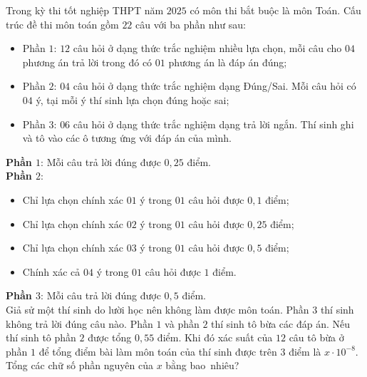 \begin{bt}%
	Trong kỳ thi tốt nghiệp THPT năm $2025$ có môn thi bắt buộc là môn Toán. Cấu trúc đề thi môn toán gồm $22$ câu với ba phần như sau: 
	\begin{itemize}
		\item Phần $1$: $12$ câu  hỏi ở dạng thức trắc nghiệm nhiều lựa chọn, mỗi câu cho $04$ phương án trả lời trong đó có $01$ phương án là đáp án đúng;
		\item Phần $2$: $04$ câu hỏi ở  dạng thức trắc nghiệm dạng Đúng/Sai. Mỗi câu hỏi có $04$ ý, tại mỗi ý thí sinh lựa chọn đúng hoặc sai;
		\item Phần $3$: $06$ câu hỏi ở dạng thức trắc nghiệm dạng trả lời ngắn. Thí sinh ghi và  tô vào các ô tương ứng với đáp án của mình.
	\end{itemize}
	\textbf{Phần $1$}: Mỗi câu  trả lời đúng được $0{,}25$ điểm.\\
	\textbf{Phần $2$}: 
	\begin{itemize}
		\item  Chỉ lựa chọn chính xác $01$ ý trong $01$ câu hỏi được $0{,}1$ điểm;
		\item Chỉ lựa chọn  chính xác $02$ ý trong $01$ câu hỏi được $0{,}25$ điểm;
		\item Chỉ lựa chọn chính xác $03$ ý trong $01$ câu  hỏi được $0{,}5$ điểm;
		\item Chính xác cả $04$ ý trong $01$ câu hỏi  được $1$ điểm.
	\end{itemize}
	\textbf{Phần $3$}: Mỗi câu trả lời đúng được  $0{,}5$ điểm.\\
	Giả sử một thí sinh do lười học nên không làm được môn toán. Phần $3$ thí sinh không trả lời đúng câu nào. Phần $1$ và phần $2$ thí sinh tô bừa các đáp án. Nếu thí sinh tô phần $2$ được tổng $0{,}55$ điểm. Khi đó xác suất của  $12$ câu tô bừa ở phần $1$ để tổng điểm bài làm môn toán của thí sinh được trên $3$ điểm là $x\cdot 10^{-8}$. Tổng các chữ số phần nguyên của $x$ bằng bao~nhiêu?
\end{bt}

